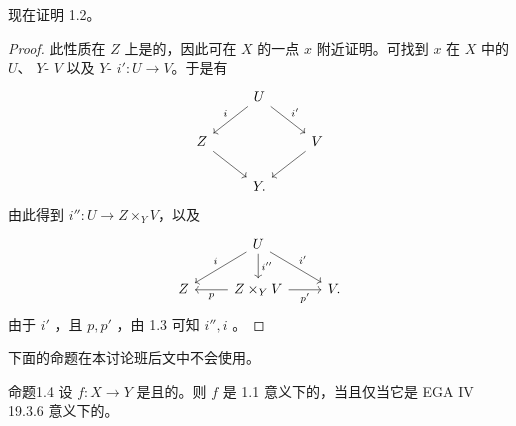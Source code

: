 现在证明 1.2。
\begin{proof}
此性质在 $Z$ 上是的，因此可在 $X$ 的一点 $x$ 附近证明。可找到 $x$ 在 $X$ 中的 $U$、 $Y$- $V$ 以及 $Y$- $i':U\to V$。于是有
\[
\begin{tikzcd}&U\arrow[dl,"i"']\arrow[dr,"i'"]\\Z\arrow[dr]&&V\arrow[dl]\\&Y.\end{tikzcd}
\]
由此得到 $i'':U\to Z\times_YV$，以及
\[
\begin{tikzcd}&U\arrow[dl,"i"']\arrow[d,"i''"]\arrow[dr,"i'"]\\Z&Z\times_YV\arrow[l,"p"]\arrow[r,"p'"']&V.\end{tikzcd}
\]
由于 $i'$ ，且 $p,p'$ ，由 1.3 可知 $i'',i$ 。
\end{proof}
下面的命题在本讨论班后文中不会使用。
\begin{SGAresult}{命题}{1.4}
设 $f:X\to Y$ 是且的。则 $f$ 是 1.1 意义下的，当且仅当它是 EGA IV 19.3.6 意义下的。
\end{SGAresult}
